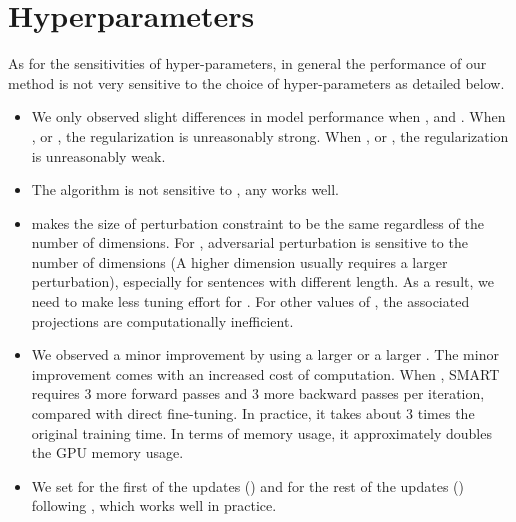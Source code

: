 \documentclass[11pt]{article} \usepackage{url}
\begin{document}
\section{Hyperparameters}
As for the sensitivities of hyper-parameters, in general the performance of our method is not very sensitive to the choice of hyper-parameters as detailed below. 
\begin{itemize}
    \item We only observed slight differences in model performance when ,  and . When ,  or  , the regularization is unreasonably strong. When ,  or , the regularization is unreasonably weak.
    \item The algorithm is not sensitive to , any  works well. 
    \item  makes the size of perturbation constraint to be the same regardless of the number of dimensions.  For , adversarial perturbation is sensitive to the number of dimensions (A higher dimension usually requires a larger perturbation), especially for sentences with different length. As a result, we need to make less tuning effort for . For other values of , the associated projections are computationally inefficient.
    \item We observed a minor improvement by using a larger  or a larger . The minor improvement comes with an increased cost of computation. When , SMART requires 3 more forward passes and 3 more backward passes per iteration, compared with direct fine-tuning. In practice, it takes about 3 times the original training time. In terms of memory usage, it approximately doubles the GPU memory usage.

\item We set  for the first  of the updates () and  for the rest of the updates  () following \citep{tarvainen2017mean}, which works well in practice. 
\end{itemize}

 
\end{document}

